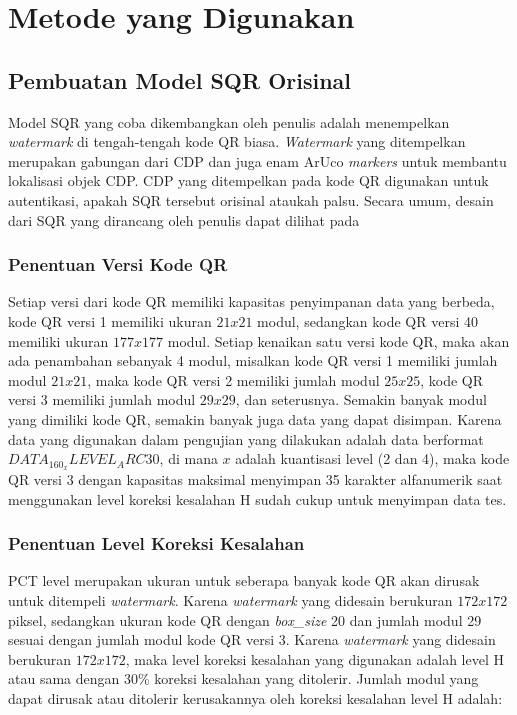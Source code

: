 \section{Metode yang Digunakan}

\subsection{Pembuatan Model SQR Orisinal}
Model SQR yang coba dikembangkan oleh penulis adalah menempelkan \emph{watermark} di tengah-tengah kode QR biasa. \emph{Watermark} yang ditempelkan merupakan
gabungan dari CDP dan juga enam ArUco \emph{markers} untuk membantu lokalisasi objek CDP. CDP yang ditempelkan pada kode QR digunakan untuk autentikasi, apakah
SQR tersebut orisinal ataukah palsu. Secara umum, desain dari SQR yang dirancang oleh penulis dapat dilihat pada

\subsubsection{Penentuan Versi Kode QR}
Setiap versi dari kode QR memiliki kapasitas penyimpanan data yang berbeda, kode QR versi 1 memiliki ukuran $21x21$ modul, sedangkan kode QR versi 40 memiliki
ukuran $177x177$ modul. Setiap kenaikan satu versi kode QR, maka akan ada penambahan sebanyak 4 modul, misalkan kode QR versi 1 memiliki jumlah modul $21x21$,
maka kode QR versi 2 memiliki jumlah modul $25x25$, kode QR versi 3 memiliki jumlah modul $29x29$, dan seterusnya. Semakin banyak modul yang dimiliki kode QR,
semakin banyak juga data yang dapat disimpan. Karena data yang digunakan dalam pengujian yang dilakukan adalah data berformat $DATA_160_{x}LEVEL_ARC30$, di
mana $x$ adalah kuantisasi level (2 dan 4), maka kode QR versi 3 dengan kapasitas maksimal menyimpan 35 karakter alfanumerik saat menggunakan level koreksi
kesalahan H sudah cukup untuk menyimpan data tes.

\subsubsection{Penentuan Level Koreksi Kesalahan}
PCT level merupakan ukuran untuk seberapa banyak kode QR akan dirusak untuk ditempeli \emph{watermark}. Karena \emph{watermark} yang didesain berukuran
$172x172$ piksel, sedangkan ukuran kode QR dengan \emph{box\_size} 20 dan jumlah modul 29 sesuai dengan jumlah modul kode QR versi 3. Karena \emph{watermark}
yang didesain berukuran $172x172$, maka level koreksi kesalahan yang digunakan adalah level H atau sama dengan 30\% koreksi kesalahan yang ditolerir. Jumlah
modul yang dapat dirusak atau ditolerir kerusakannya oleh koreksi kesalahan level H adalah:

